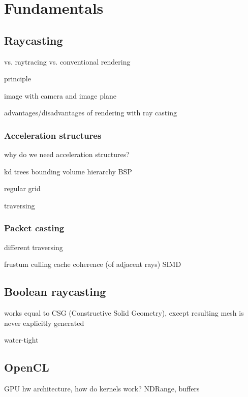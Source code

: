 \section{Fundamentals}

\subsection{Raycasting}

vs. raytracing
vs. conventional rendering

principle

image with camera and image plane

advantages/disadvantages of rendering with ray casting

\subsubsection{Acceleration structures}

why do we need acceleration structures?

kd trees
bounding volume hierarchy
BSP

regular grid

traversing

\subsubsection{Packet casting}

different traversing

frustum culling
cache coherence (of adjacent rays)
SIMD


\subsection{Boolean raycasting}

works equal to CSG (Constructive Solid Geometry), except resulting mesh is never explicitly generated

water-tight

\subsection{OpenCL}

GPU hw architecture, how do kernels work? NDRange, buffers
